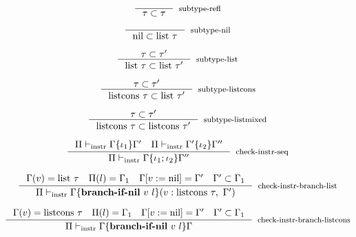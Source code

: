 \documentclass[sigconf]{acmart}
\theoremstyle{definition}
\begin{document}
\begin{equation}
\inference{}
          {\tau \subset \tau}[subtype-refl]
\end{equation}

\begin{equation}
\inference{}
          {\text{nil} \subset \text{list}~\tau}[subtype-nil]
\end{equation}

\begin{equation}
\inference{\tau \subset \tau'}
          {\text{list}~\tau \subset \text{list}~\tau'}[subtype-list]
\end{equation}

\begin{equation}
\inference{\tau \subset \tau'}
          {\text{listcons}~\tau \subset \text{list}~\tau'}[subtype-listcons]
\end{equation}

\begin{equation}
\inference{\tau \subset \tau'}
          {\text{listcons}~\tau \subset \text{listcons}~\tau'}[subtype-listmixed]
\end{equation}


\begin{equation}
\inference{\Pi \vdash_{\text{instr}} \Gamma\{ \iota_1 \}\Gamma'~~~\Pi \vdash_{\text{instr}} \Gamma'\{ \iota_2 \}\Gamma''}
          {\Pi \vdash_{\text{instr}} \Gamma\{ \iota_1 ; \iota_2 \}\Gamma''}[check-instr-seq]
\end{equation}

\begin{equation}
\inference{\Gamma(v) = \text{list}~\tau~~~\Pi(l) = \Gamma_1~~~\Gamma[v:=\text{nil}]=\Gamma'~~~\Gamma' \subset \Gamma_1}
          {\Pi \vdash_{\text{instr}} \Gamma\{ \textbf{branch-if-nil}~v~l \}(v: \text{listcons}~\tau,~\Gamma')}[check-instr-branch-list]
\end{equation}

\begin{equation}
\inference{\Gamma(v) = \text{listcons}~\tau~~~\Pi(l) = \Gamma_1~~~\Gamma[v:=\text{nil}]=\Gamma'~~~\Gamma' \subset \Gamma_1}
          {\Pi \vdash_{\text{instr}} \Gamma\{ \textbf{branch-if-nil}~v~l \}\Gamma}[check-instr-branch-listcons]
\end{equation}
\end{document}
